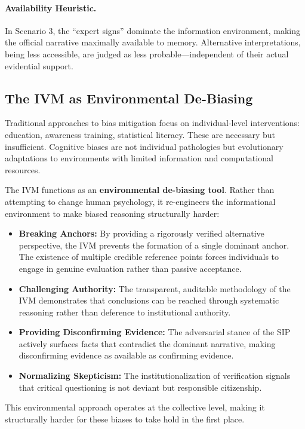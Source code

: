 \documentclass[11pt,a4paper]{article}
\begin{document}
\paragraph{Availability Heuristic.} In Scenario 3, the ``expert signs'' dominate the information environment, making the official narrative maximally available to memory. Alternative interpretations, being less accessible, are judged as less probable---independent of their actual evidential support.

\subsection{The IVM as Environmental De-Biasing}

Traditional approaches to bias mitigation focus on individual-level interventions: education, awareness training, statistical literacy. These are necessary but insufficient. Cognitive biases are not individual pathologies but evolutionary adaptations to environments with limited information and computational resources.

The IVM functions as an \textbf{environmental de-biasing tool}. Rather than attempting to change human psychology, it re-engineers the informational environment to make biased reasoning structurally harder:

\begin{itemize}
    \item \textbf{Breaking Anchors:} By providing a rigorously verified alternative perspective, the IVM prevents the formation of a single dominant anchor. The existence of multiple credible reference points forces individuals to engage in genuine evaluation rather than passive acceptance.
    \item \textbf{Challenging Authority:} The transparent, auditable methodology of the IVM demonstrates that conclusions can be reached through systematic reasoning rather than deference to institutional authority.
    \item \textbf{Providing Disconfirming Evidence:} The adversarial stance of the SIP actively surfaces facts that contradict the dominant narrative, making disconfirming evidence as available as confirming evidence.
    \item \textbf{Normalizing Skepticism:} The institutionalization of verification signals that critical questioning is not deviant but responsible citizenship.
\end{itemize}

This environmental approach operates at the collective level, making it structurally harder for these biases to take hold in the first place.
\end{document}
